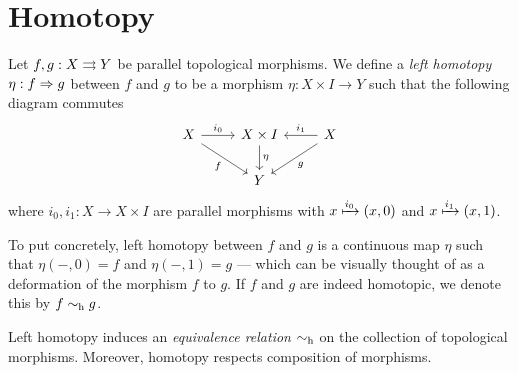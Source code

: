 \section{Homotopy}

\begin{definition}
\label{def:left-homotopy-Top}
Let \(f, g: X \rightrightarrows Y\) be parallel topological morphisms. We define a
\emph{left homotopy} \(\eta: f \Rightarrow g\) between \(f\) and \(g\) to be a morphism
\(\eta: X \times I \to Y\) such that the following diagram commutes
\[
\begin{tikzcd}
X \ar[d, rd, "f"'] \ar[r, "i_0"]
& X \times I \ar[d, "\eta"]
& X \ar[l, "i_1"'] \ar[ld, "g"]
\\
& Y
\end{tikzcd}
\]
where \(i_0, i_1: X \to X \times I\) are parallel morphisms with \(x
\xmapsto{i_{0}} (x, 0)\) and \(x \xmapsto{i_{1}} (x, 1)\).
\end{definition}

To put concretely, left homotopy between \(f\) and \(g\) is a continuous map
\(\eta\) such that \(\eta(-, 0) = f\) and \(\eta(-, 1) = g\) --- which can be
visually thought of as a deformation of the morphism \(f\) to \(g\). If \(f\)
and \(g\) are indeed homotopic, we denote this by \(f \sim_{\text{h}} g\).

\begin{corollary}
\label{cor:htpy-equivalence-rel}
Left homotopy induces an \emph{equivalence relation} \(\sim_{\text{h}}\) on the
collection of topological morphisms. Moreover, homotopy respects composition of
morphisms.
\end{corollary}

